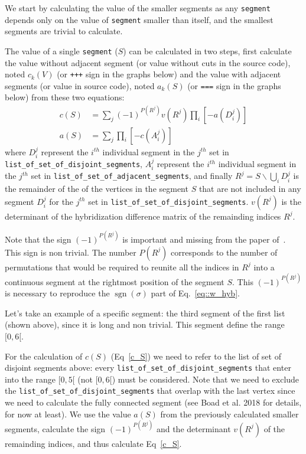 \documentclass[10pt,letter]{article}
\begin{document}
We start by calculating the value of the smaller segments as any \Verb#segment# depends only on the value of \Verb#segment# smaller than itself, and the smallest segments are trivial to calculate. 

The value of a single \Verb#segment# ($S$) can be calculated in two steps, first calculate the value without adjacent segment (or value without cuts in the source code), noted $c_k(V)$ (or \Verb#+++# sign in the graphs below) and the value with adjacent segments (or value in source code), noted $a_k(S)$ (or \Verb#===# sign in the graphs below) from these two equations:
\begin{align} 
\label{c_S}
c(S) &=\sum_{j} (-1)^{P(R^j)}  v(R^j) \prod_{i}\left[-a(D^j_{i})\right]
\\
\label{a_S}
a(S) &=\sum_{j} \prod_{i}\left[-c(A^j_{i})\right]
\end{align}
where $D^j_{i}$ represent the $i^{th}$ individual segment in the $j^{th}$ set in \Verb#list_of_set_of_disjoint_segments#, $A^j_{i}$  represent the $i^{th}$ individual segment in the $j^{th}$ set in \Verb#list_of_set_of_adjacent_segments#, and finally $R^j = S \backslash \bigcup_{i} D^j_{i}$ is the remainder of the of the vertices in the segment $S$ that are not included in any segment $D^j_{i}$ for the $j^{th}$ set in \Verb#list_of_set_of_disjoint_segments#. $v(R^j)$ is the determinant of the hybridization difference matrix of the remainding indices $R^j$.

Note that the sign $ (-1)^{P(R^j)}$ is important and missing from the paper of~\cite{boag_inclusion-exclusion_2018}. This sign is non trivial. The number $P(R^j)$ corresponds to the number of permutations that would be required to reunite all the indices in $R^j$ into a continuous segment at the rightmost position of the segment $S$. This $ (-1)^{P(R^j)}$ is necessary to reproduce the $\operatorname{sgn}(\sigma)$ part of Eq.~\eqref{eq::w_hyb}. 

Let's take an example of a specific segment: the third segment of the first list (shown above), since it is long and non trivial. This segment define the range $[0,6[$. 

For the calculation of $c(S)$ (Eq~\eqref{c_S}) we need to refer to the list of set of disjoint segments above: every \Verb#list_of_set_of_disjoint_segments# that enter into the range $[0,5[$ (not $[0,6[$) must be considered. Note that we need to exclude the \Verb#list_of_set_of_disjoint_segments# that overlap with the last vertex since we need to calculate the fully connected segment (see Boad et al. 2018 for details, for now at least). We use the value $a(S)$ from the previously calculated smaller segments, calculate the sign $ (-1)^{P(R^j)}$ and the determinant $v(R^j)$ of the remainding indices, and thus calculate Eq~\eqref{c_S}.
\end{document}
